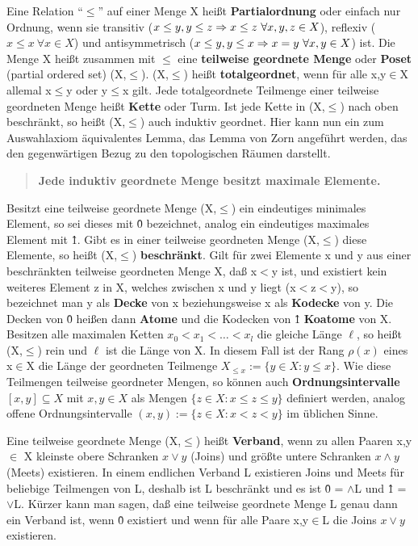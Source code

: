 Eine Relation "`$\leq$"' auf einer Menge X heißt {\bf Partialordnung} oder
einfach nur Ordnung, wenn sie transitiv ($x\leq y, y\leq z\Rightarrow x\leq z~\forall
x,y,z\in X$), reflexiv ($x\leq x~\forall x\in X$) und antisymmetrisch ($x\leq y,
y\leq x\Rightarrow x = y~\forall x,y\in X$) ist. Die Menge X heißt zusammen mit
$\leq$ eine {\bf teilweise geordnete Menge} oder {\bf Poset} (partial ordered
set) (X,$\leq$).
(X,$\leq$) heißt {\bf totalgeordnet}, wenn für alle
x,y$\in$X allemal x$\leq$y oder y$\leq$x gilt. Jede totalgeordnete Teilmenge
einer teilweise geordneten Menge heißt {\bf Kette} oder Turm.
 Ist jede Kette in (X,$\leq$) nach oben beschränkt, so heißt
(X,$\leq$) auch induktiv geordnet.
Hier kann nun ein zum Auswahlaxiom äquivalentes Lemma, das Lemma von Zorn
angeführt werden, das den gegenwärtigen Bezug zu den topologischen Räumen
darstellt.
\begin{quote}
{\bf Jede induktiv geordnete Menge besitzt maximale Elemente.}
\end{quote}
Besitzt eine teilweise geordnete Menge (X,$\leq$) ein eindeutiges minimales
Element, so sei dieses mit \^0 bezeichnet, analog ein eindeutiges maximales
Element mit \^1. Gibt es in einer teilweise geordneten Menge (X,$\leq$) diese
Elemente, so heißt (X,$\leq$) {\bf beschränkt}. Gilt für zwei Elemente x
und y aus einer beschränkten teilweise geordneten Menge X, daß x$<$y ist, und
existiert kein weiteres Element z in X, welches zwischen x und y liegt
(x$<$z$<$y), so bezeichnet man y als {\bf Decke} von x
beziehungsweise x als {\bf Kodecke} von y. Die Decken von \^0 heißen dann
{\bf Atome} und die Kodecken von \^1 {\bf Koatome} von X.
Besitzen alle maximalen Ketten $x_0<x_1<\ldots<x_l$ die gleiche Länge $\ell$,
so heißt (X,$\leq$) rein und $\ell$ ist die Länge
von X. In diesem Fall ist der Rang $\rho(x)$ eines x$\in$X die Länge der
geordneten Teilmenge $X_{\leq x}:=\{y\in X:y\leq x\}$. Wie diese Teilmengen
teilweise geordneter Mengen, so können auch {\bf Ordnungsintervalle}
 $[x,y]\subseteq X$ mit $x,y\in X$ als Mengen
$\{z\in X:x\leq z\leq y\}$ definiert werden, analog offene Ordnungsintervalle
$(x,y) := \{z\in X:x<z<y\}$ im üblichen Sinne.

Eine teilweise geordnete Menge (X,$\leq$) heißt {\bf Verband},
wenn zu allen Paaren x,y$\in$ X kleinste obere Schranken $x\vee y$ (Joins) und
größte untere Schranken $x\wedge y$ (Meets) existieren. In einem endlichen
Verband L existieren Joins und Meets für beliebige Teilmengen von L, deshalb
ist L beschränkt und es ist \^0 = $\wedge$L und \^1 = $\vee$L.
Kürzer kann man sagen, daß eine teilweise geordnete Menge L genau dann ein
Verband ist, wenn \^0 existiert und wenn für alle Paare x,y$\in$L die Joins
$x\vee y$ existieren. 

